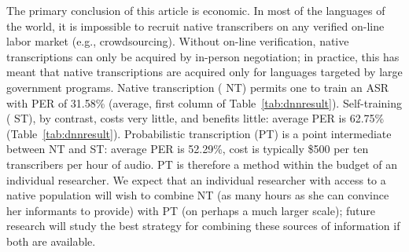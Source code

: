 {\color{blue} The primary conclusion of this article is economic.  In
  most of the languages of the world, it is impossible to recruit
  native transcribers on any verified on-line labor market (e.g.,
  crowdsourcing).  Without on-line verification, native transcriptions
  can only be acquired by in-person negotiation; in practice, this has
  meant that native transcriptions are acquired only for languages
  targeted by large government programs.  Native transcription ({\sc
    NT}) permits one to train an ASR with PER of 31.58\% (average,
  first column of Table~\ref{tab:dnnresult}).  Self-training ({\sc
    ST}), by contrast, costs very little, and benefits little: average
  PER is 62.75\% (Table~\ref{tab:dnnresult}).  Probabilistic
  transcription ({\sc PT}) is a point intermediate between {\sc NT}
  and {\sc ST}: average PER is 52.29\%, cost is typically \$500 per
  ten transcribers per hour of audio. {\sc PT} is therefore a method
  within the budget of an individual researcher.  We expect that an
  individual researcher with access to a native population will wish
  to combine {\sc NT} (as many hours as she can convince her
  informants to provide) with {\sc PT} (on perhaps a much larger
  scale); future research will study the best strategy for combining
  these sources of information if both are available.}


